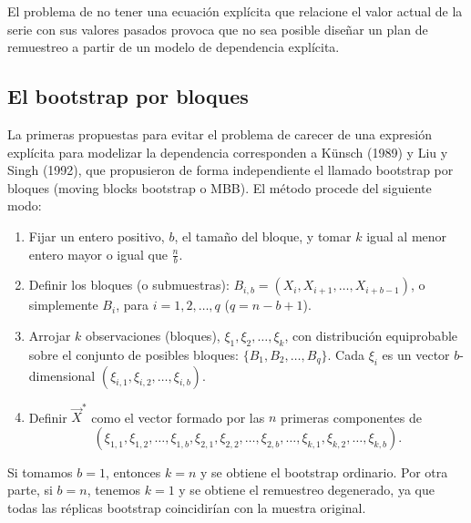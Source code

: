 \documentclass[]{book}
\theoremstyle{break}
\theoremstyle{definition}
\theoremstyle{definition}
\theoremstyle{definition}
\theoremstyle{remark}
\begin{document}
El problema de no tener una ecuación explícita que relacione el valor
actual de la serie con sus valores pasados provoca que no sea posible
diseñar un plan de remuestreo a partir de un modelo de dependencia
explícita.

\subsection{El bootstrap por bloques}\label{el-bootstrap-por-bloques}

La primeras propuestas para evitar el problema de carecer de una
expresión explícita para modelizar la dependencia corresponden a Künsch
(1989) y Liu y Singh (1992), que propusieron de forma independiente el
llamado bootstrap por bloques (moving blocks bootstrap o MBB). El método
procede del siguiente modo:

\begin{enumerate}
\def\labelenumi{\arabic{enumi}.}
\item
  Fijar un entero positivo, \(b\), el tamaño del bloque, y tomar \(k\)
  igual al menor entero mayor o igual que \(\frac{n}{b}\).
\item
  Definir los bloques (o submuestras):
  \(B_{i,b}=(X_i,X_{i+1},\ldots ,X_{i+b-1})\), o simplemente \(B_i\),
  para \(i=1,2,\ldots ,q\) (\(q=n-b+1\))\(.\)
\item
  Arrojar \(k\) observaciones (bloques),
  \(\xi _1,\xi _2,\ldots ,\xi _{k}\), con distribución equiprobable
  sobre el conjunto de posibles bloques: \(\{B_1,B_2,\ldots ,B_{q}\}\).
  Cada \(\xi _i\) es un vector \(b\)-dimensional
  \((\xi _{i,1},\xi _{i,2},\ldots ,\xi _{i,b})\).
\item
  Definir \(\vec{X}^{\ast}\) como el vector formado por las \(n\)
  primeras componentes de
  \[(\xi _{1,1},\xi _{1,2},\ldots ,\xi _{1,b},\xi _{2,1},\xi _{2,2},\ldots ,\xi
  _{2,b},\ldots ,\xi _{k,1},\xi _{k,2},\ldots ,\xi _{k,b}).\]
\end{enumerate}

Si tomamos \(b=1\), entonces \(k=n\) y se obtiene el bootstrap
ordinario. Por otra parte, si \(b=n\), tenemos \(k=1\) y se obtiene el
remuestreo degenerado, ya que todas las réplicas bootstrap coincidirían
con la muestra original.
\end{document}
